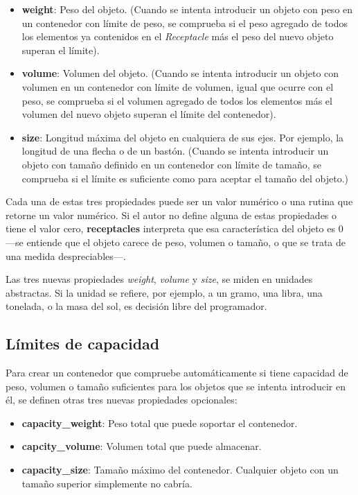 \documentclass[a4paper,12pt]{article}
\numberwithin{equation}{section}
\begin{document}
\begin{itemize}

\item \textbf{weight}: Peso del objeto. (Cuando se intenta introducir un objeto con peso en un contenedor con límite de peso, se comprueba si el peso agregado de todos los elementos ya contenidos en el \emph{Receptacle} más el peso del nuevo objeto superan el límite).

\item \textbf{volume}: Volumen del objeto. (Cuando se intenta introducir un objeto con volumen en un contenedor con límite de volumen, igual que ocurre con el peso, se comprueba si el volumen agregado de todos los elementos más el volumen del nuevo objeto superan el límite del contenedor).

\item \textbf{size}: Longitud máxima del objeto en cualquiera de sus ejes. Por ejemplo, la longitud de una flecha o de un bastón. (Cuando se intenta introducir un objeto con tamaño definido en un contenedor con límite de tamaño, se comprueba si el límite es suficiente como para aceptar el tamaño del objeto.)
\end{itemize}

Cada una de estas tres propiedades puede ser un valor numérico o una rutina que retorne un valor numérico. Si el autor no define alguna de estas propiedades o tiene el valor cero, \textbf{receptacles} interpreta que esa característica del objeto es 0 ---se entiende que el objeto carece de peso, volumen o tamaño, o que se trata de una medida despreciables---.

Las tres nuevas propiedades \emph{weight}, \emph{volume} y \emph{size}, se miden en unidades abstractas. Si la unidad se refiere, por ejemplo, a un gramo, una libra, una tonelada, o la masa del sol, es decisión libre del programador.

\subsection{Límites de capacidad} \label{sec:limites-capacidad}

Para crear un contenedor que compruebe automáticamente si tiene capacidad de peso, volumen o tamaño suficientes para los objetos que se intenta introducir en él, se definen otras tres nuevas propiedades opcionales:

\begin{itemize}

\item \textbf{capacity_weight}: Peso total que puede soportar el contenedor.

\item \textbf{capcity_volume}: Volumen total que puede almacenar.

\item \textbf{capacity_size}: Tamaño máximo del contenedor. Cualquier objeto con un tamaño superior simplemente no cabría.
\end{itemize}
\end{document}

